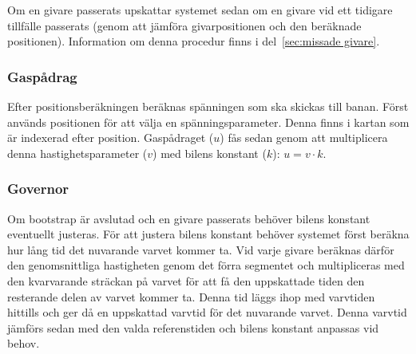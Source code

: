 Om en givare passerats upskattar systemet sedan om en givare vid ett tidigare
tillfälle passerats (genom att jämföra givarpositionen och den beräknade
positionen). Information om denna procedur finns i del~\ref{sec:missade givare}.


\subsubsection{Gaspådrag}

Efter positionsberäkningen beräknas spänningen som ska skickas till banan. Först används positionen för att välja en spänningsparameter. Denna finns i kartan som är indexerad efter position. Gaspådraget ($u$) fås sedan genom att multiplicera denna hastighetsparameter ($v$) med bilens konstant ($k$): $u = v \cdot k$.

% 
%  

\subsubsection{Governor}
\label{sec:systembeskrivning:governor}

Om bootstrap är avslutad och en givare passerats behöver bilens konstant
eventuellt justeras. För att justera bilens konstant behöver systemet först beräkna hur lång tid det
nuvarande varvet kommer ta. Vid varje givare beräknas därför den genomsnittliga
hastigheten genom det förra segmentet och multipliceras med den kvarvarande
sträckan på varvet för att få den uppskattade tiden den resterande delen av
varvet kommer ta. Denna tid läggs ihop med varvtiden hittills och ger då en
uppskattad varvtid för det nuvarande varvet. Denna varvtid jämförs sedan med den
valda referenstiden och bilens konstant anpassas vid behov.

